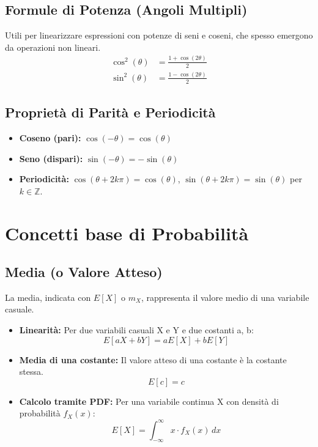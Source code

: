 \subsection{Formule di Potenza (Angoli Multipli)}
Utili per linearizzare espressioni con potenze di seni e coseni, che spesso emergono da operazioni non lineari.
\begin{align*}
    \cos^2(\theta) &= \frac{1 + \cos(2\theta)}{2} \\
    \sin^2(\theta) &= \frac{1 - \cos(2\theta)}{2}
\end{align*}

\subsection{Proprietà di Parità e Periodicità}
\begin{itemize}
    \item \textbf{Coseno (pari):} $\cos(-\theta) = \cos(\theta)$
    \item \textbf{Seno (dispari):} $\sin(-\theta) = -\sin(\theta)$
    \item \textbf{Periodicità:} $\cos(\theta + 2k\pi) = \cos(\theta)$, $\sin(\theta + 2k\pi) = \sin(\theta)$ per $k \in \mathbb{Z}$.
\end{itemize}

\section{Concetti base di Probabilità}

\subsection{Media (o Valore Atteso)}
La media, indicata con $E[X]$ o $m_X$, rappresenta il valore medio di una variabile casuale.

\begin{itemize}
    \item \textbf{Linearità:} Per due variabili casuali X e Y e due costanti a, b:
    $$ E[aX + bY] = aE[X] + bE[Y] $$
    
    \item \textbf{Media di una costante:} Il valore atteso di una costante è la costante stessa.
    $$ E[c] = c $$
    
    \item \textbf{Calcolo tramite PDF:} Per una variabile continua X con densità di probabilità $f_X(x)$:
    $$ E[X] = \int_{-\infty}^{\infty} x \cdot f_X(x) \,dx $$
\end{itemize}


